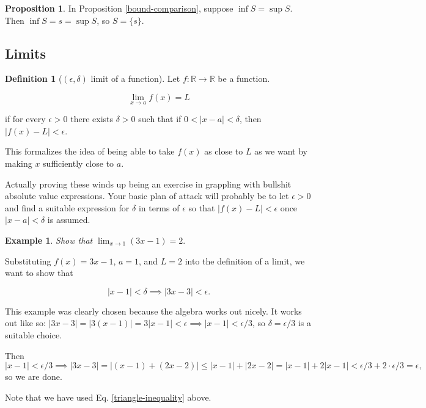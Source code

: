 \documentclass{article}
\theoremstyle{definition}
\newtheorem{definition}{Definition}[section]
\newtheorem{example}{Example}[section]
\newtheorem{proposition}{Proposition}[section]
\begin{document}
\begin{proposition}
In Proposition \ref{bound-comparison}, suppose $\inf S = \sup S$. Then $\inf S = s = \sup S$, so $S = \{s\}$.
\end{proposition}

\subsection{Limits}


\begin{definition}[$(\epsilon, \delta)$ limit of a function]

Let $f: \mathbb{R} \to \mathbb{R}$ be a function. 

\begin{equation}
\lim_{x \to a} f(x) = L
\end{equation}

if for every $\epsilon > 0$ there exists $\delta > 0$ such that if $0 < |x-a| <
\delta$, then $|f(x) - L| < \epsilon$.
 
\end{definition}

This formalizes the idea of being able to take $f(x)$ as close to $L$ as we want
by making $x$ sufficiently close to $a$.

Actually proving these winds up being an exercise in grappling with bullshit
absolute value expressions. Your basic plan of attack will probably be to let
$\epsilon > 0$ and find a suitable expression for $\delta$ in terms of
$\epsilon$ so that $|f(x) -L| < \epsilon$ once $|x-a|< \delta$ is assumed.

\begin{example} 

\emph{Show that $\lim_{x \to 1} (3x-1) = 2$}.

Substituting $f(x) = 3x-1$, $a = 1$, and $L = 2$ into the definition of a limit,
we want to show that

\begin{equation}
|x - 1| < \delta \implies |3x - 3| < \epsilon.
\end{equation}

This example was clearly chosen because the algebra works out nicely. It
works out like so: $|3x-3| = |3(x-1)| = 3|x-1| < \epsilon \implies |x-1| <
\epsilon/3$, so $\delta = \epsilon/3$ is a suitable choice.

Then $|x - 1| < \epsilon/3 \implies |3x-3| = |(x - 1) + (2x-2)| \leq |x-1| +
|2x-2| = |x-1| + 2|x-1| < \epsilon/3 + 2 \cdot \epsilon/3 = \epsilon,$ so we are
done.

Note that we have used Eq. \ref{triangle-inequality} above.
 
\end{example}
\end{document}
